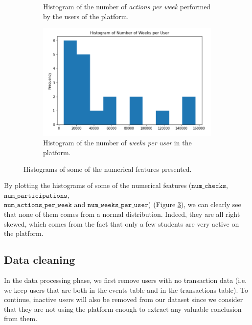 \documentclass[sigplan,screen]{acmart}
\begin{document}
\begin{figure}
\begin{subfigure}[b]{\linewidth}
         \caption{Histogram of the number of \emph{actions per week} performed by the users of the platform.}
         \label{fig:actions_per_week}
     \end{subfigure}
     \hfill
     \begin{subfigure}[b]{\linewidth}
         \centering
         \includegraphics[width=0.82\linewidth]{reports/figures/histogram_number_of_weeks_per_user.png}
         \caption{Histogram of the number of \emph{weeks per user} in the platform.}
         \label{fig:weeks_per_user}
     \end{subfigure}
        \caption{Histograms of some of the numerical features presented.}
        \label{fig:histograms}
\end{figure}

By plotting the histograms of some of the numerical features ($\texttt{num\_checks}$, $\texttt{num\_participations}$, \\ $\texttt{num\_actions\_per\_week}$ and $\texttt{num\_weeks\_per\_user}$) (Figure \ref{fig:histograms}), we can clearly see that none of them comes from a normal distribution. Indeed, they are all right skewed, which comes from the fact that only a few students are very active on the platform.

\subsection{Data cleaning} \label{data:cleaning}

In the data processing phase, we first remove users with no transaction data (i.e. we keep users that are both in the events table and in the transactions table). To continue, inactive users will also be removed from our dataset since we consider that they are not using the platform enough to extract any valuable conclusion from them.
\end{document}
